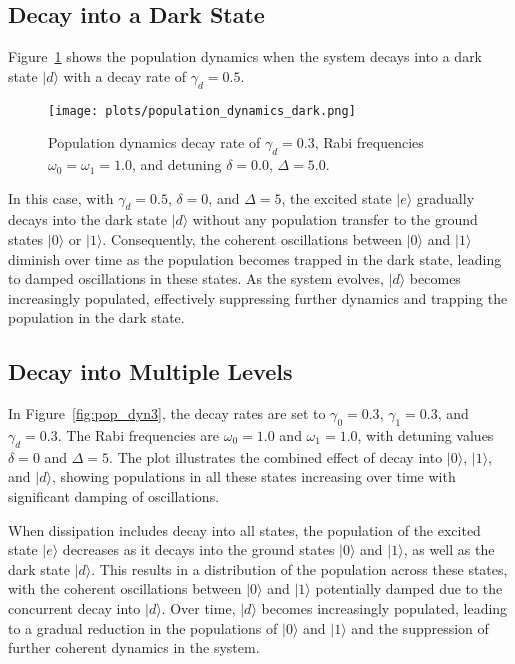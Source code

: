 \documentclass{article}
\begin{document}
\subsection{Decay into a Dark State}



Figure~\ref{fig:pop_dyn2} shows the population dynamics when the system decays into a dark state \(|d\rangle\) with a decay rate of \(\gamma_d = 0.5\).

\begin{figure}[h!]
    \centering
    \texttt{[image: plots/population\_dynamics\_dark.png]}
    \caption{Population dynamics decay rate of \(\gamma_d = 0.3\), Rabi frequencies \(\omega_0 = \omega_1 = 1.0\), and detuning \(\delta = 0.0\), \(\Delta = 5.0\).}
    \label{fig:pop_dyn2}
\end{figure}

In this case, with \(\gamma_d = 0.5\), \(\delta = 0\), and \(\Delta = 5\), the excited state \(|e\rangle\) gradually decays into the dark state \(|d\rangle\) without any population transfer to the ground states \(|0\rangle\) or \(|1\rangle\). Consequently, the coherent oscillations between \(|0\rangle\) and \(|1\rangle\) diminish over time as the population becomes trapped in the dark state, leading to damped oscillations in these states. As the system evolves, \(|d\rangle\) becomes increasingly populated, effectively suppressing further dynamics and trapping the population in the dark state.


\subsection{Decay into Multiple Levels}

In Figure~\ref{fig:pop_dyn3}, the decay rates are set to \(\gamma_0 = 0.3\), \(\gamma_1 = 0.3\), and \(\gamma_d = 0.3\). The Rabi frequencies are \(\omega_0 = 1.0\) and \(\omega_1 = 1.0\), with detuning values \(\delta = 0\) and \(\Delta = 5\). The plot illustrates the combined effect of decay into \(|0\rangle\), \(|1\rangle\), and \(|d\rangle\), showing populations in all these states increasing over time with significant damping of oscillations.

When dissipation includes decay into all states, the population of the excited state \(|e\rangle\) decreases as it decays into the ground states \(|0\rangle\) and \(|1\rangle\), as well as the dark state \(|d\rangle\). This results in a distribution of the population across these states, with the coherent oscillations between \(|0\rangle\) and \(|1\rangle\) potentially damped due to the concurrent decay into \(|d\rangle\). Over time, \(|d\rangle\) becomes increasingly populated, leading to a gradual reduction in the populations of \(|0\rangle\) and \(|1\rangle\) and the suppression of further coherent dynamics in the system.
\end{document}
